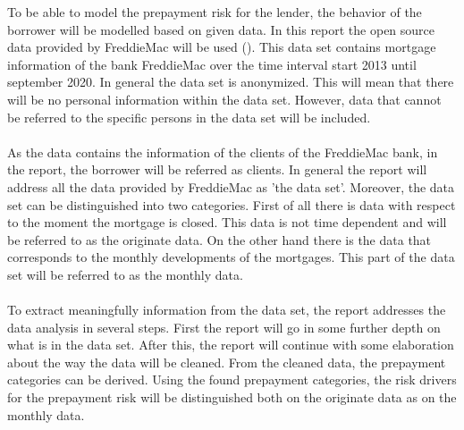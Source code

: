 To be able to model the prepayment risk for the lender, the behavior of 
the borrower will be modelled based on given data. In this report
the open source data provided by FreddieMac will be used (\cite{FredieMac}). This data set contains mortgage information of the bank FreddieMac over the time
interval start 2013 until september 2020. In general the data set is anonymized.
This will mean that there will be no personal information within the data set.
However, data that cannot be referred to the specific persons in the data set
will be included.
\\\\
As the data contains the information of the clients of the FreddieMac bank, in 
the report, the borrower will be referred as clients. In general the report will 
address all the data provided by FreddieMac as 'the data set'. Moreover, the 
data set can be distinguished into two categories. First of all there is data 
with respect to the moment the mortgage is closed. This data is not time 
dependent and will be referred to as the originate data. On the other hand 
there is the data that corresponds to the monthly developments of the 
mortgages. This part of the data set will be referred to as the monthly 
data.
\\\\
To extract meaningfully information from the data set, the report addresses 
the data analysis in several steps. First the report will go in some 
further depth on what is in the data set. After this, the report will 
continue with some elaboration about the way the data will be cleaned. 
From the cleaned data, the prepayment categories can be derived. Using the 
found prepayment categories, the risk drivers for the prepayment risk 
will be distinguished both on the originate data as on the monthly data.  

